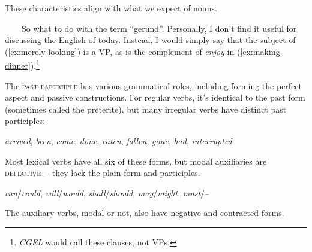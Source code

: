 \begin{tcolorbox}[title=What about gerunds?\is{gerund@``gerund''}, colback=white]
These characteristics align with what we expect of nouns.

~~~~So what to do with the term ``gerund''. Personally, I don't find it useful for discussing the English of today. Instead, I would simply say that the subject of  (\ref{ex:merely-looking}) is a VP, as is the complement of \textit{enjoy} in (\ref{ex:making-dinner}).\footnote{\textit{CGEL} would call these clauses, not VPs.}

\end{tcolorbox}

The \textsc{past participle} has various grammatical roles, including forming the perfect aspect and passive constructions. For regular verbs, it's identical to the past form (sometimes called the preterite), but many irregular verbs have distinct past participles:

\ea \textit{arrived}, \textit{been}, \textit{come}, \textit{done}, \textit{eaten}, \textit{fallen}, \textit{gone}, \textit{had}, \textit{interrupted}\label{ex:past-participles}
\z

Most lexical verbs have all six of these forms, but modal auxiliaries are \textsc{defective}~-- they lack the plain form and participles.\label{sec:defective-modals}

\ea \textit{can}/\textit{could}, \textit{will}/\textit{would}, \textit{shall}/\textit{should}, \textit{may}/\textit{might}, \textit{must}/--
\z

\noindent The auxiliary verbs, modal or not, also have negative and contracted forms.

